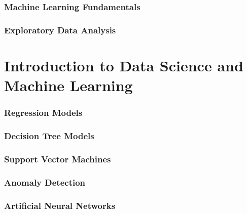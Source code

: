 \documentclass[8pt, aspectratio=169, notes]{beamer}
\begin{document}
    \section{Machine Learning Fundamentals}
    
%    

    \section{Exploratory Data Analysis}
    
%    
    
    \part{Introduction to Data Science and Machine Learning}
    
    \section{Regression Models}
    
%    
    
    \section{Decision Tree Models}
    
%    
       
    \section{Support Vector Machines}
    
%    
    
    \section{Anomaly Detection}
    
%    
    
    \section{Artificial Neural Networks}
    
%    
\end{document}
